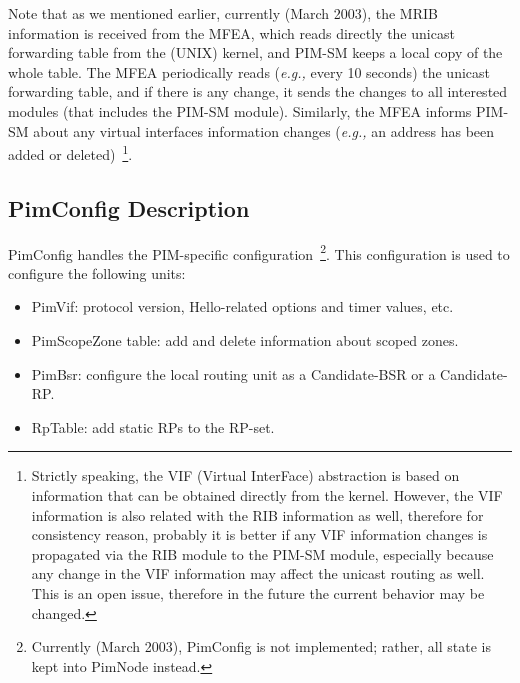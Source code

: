 \documentclass[11pt]{article}
\newcommand{\eg}{\emph{e.g.,}\xspace}
\begin{document}
Note that as we mentioned earlier, currently (March 2003), the MRIB
information is received from the MFEA, which reads directly the unicast
forwarding table from the (UNIX) kernel, and PIM-SM keeps a local copy
of the whole table. The MFEA periodically reads (\eg every 10 seconds)
the unicast forwarding table, and if there is any change, it sends the
changes to all interested modules (that includes the PIM-SM module).
Similarly, the MFEA informs PIM-SM about any virtual interfaces
information changes (\eg an address has been added or
deleted)~\footnote{Strictly speaking, the VIF (Virtual InterFace)
abstraction is based on 
information that can be obtained directly from the kernel. However, the
VIF information is also related with the RIB information as well,
therefore for consistency reason, probably it is better if any VIF
information changes is propagated via the RIB module to the PIM-SM
module, especially because any change in the VIF information may affect
the unicast routing as well. This is an open issue, therefore in the
future the current behavior may be changed.}.

\subsection{PimConfig Description}

PimConfig handles the PIM-specific configuration~\footnote{Currently
(March 2003), PimConfig is not implemented; rather, all state is
kept into PimNode instead.}. This configuration is used to configure the
following units:

\begin{itemize}

  \item PimVif: protocol version, Hello-related options and timer
  values, etc.

  \item PimScopeZone table: add and delete information about scoped zones.

  \item PimBsr: configure the local routing unit as a Candidate-BSR or a
  Candidate-RP.

  \item RpTable: add static RPs to the RP-set.

\end{itemize}


\appendix
\end{document}
